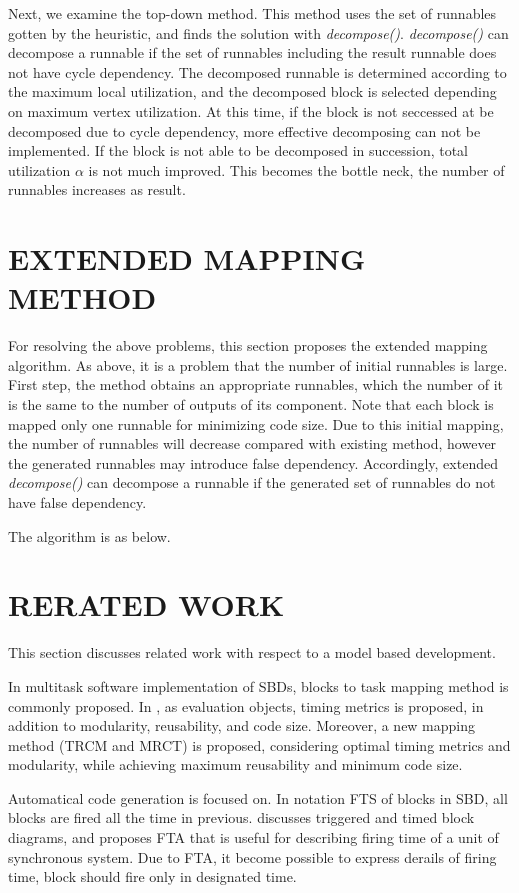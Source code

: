 \documentclass[conference,compsoc]{IEEEtran}
\begin{document}
Next, we examine the top-down method.
This method uses the set of runnables gotten by the heuristic, and finds the solution with {\it decompose()}.
{\it decompose()} can decompose a runnable if the set of runnables including the result runnable does not have cycle dependency.
The decomposed runnable is determined according to the maximum local utilization, and the decomposed block is selected depending on maximum vertex utilization.
At this time, if the block is not seccessed at be decomposed due to cycle dependency, more effective decomposing can not be implemented.
If the block is not able to be decomposed in succession, total utilization $\alpha$ is not much improved.
This becomes the bottle neck, the number of runnables increases as result.

\section{EXTENDED MAPPING METHOD}
 For resolving the above problems, this section proposes the extended mapping algorithm.
As above, it is a problem that the number of initial runnables is large.
First step, the method obtains an appropriate runnables, which the number of it is the same to the number of outputs of its component.
Note that each block is mapped only one runnable for minimizing code size.
Due to this initial mapping, the number of runnables will decrease compared with existing method, however the generated runnables may introduce false dependency.
Accordingly, extended {\it decompose()} can decompose a runnable if the generated set of runnables do not have false dependency.

The algorithm is as below.


\section{RERATED WORK}
 This section discusses related work with respect to a model based development.

 In multitask software implementation of SBDs, blocks to task mapping method is commonly proposed.
In \cite{6871195}, as evaluation objects, timing metrics is proposed, in addition to modularity, reusability, and code size.
Moreover, a new mapping method (TRCM and MRCT) is proposed, considering optimal timing metrics and modularity, while achieving maximum reusability and minimum code size. 

 Automatical code generation is focused on.
In notation FTS of blocks in SBD, all blocks are fired all the time in previous. 
\cite{4550788} discusses triggered and timed block diagrams, and proposes FTA that is useful for describing firing time of a unit of synchronous system.
Due to FTA, it become possible to express derails of firing time, block should fire only in designated time.
\end{document}
